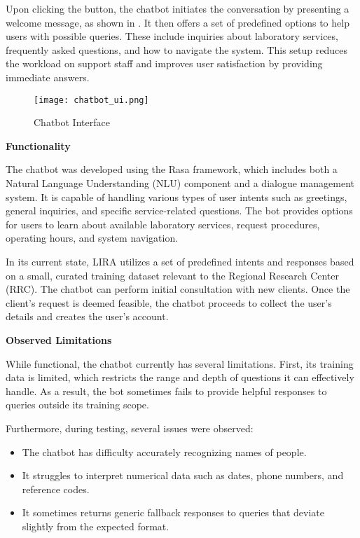 Upon clicking the button, the chatbot initiates the conversation by presenting a welcome message, as shown in . It then offers a set of predefined options to help users with possible queries. These include inquiries about laboratory services, frequently asked questions, and how to navigate the system. This setup reduces the workload on support staff and improves user satisfaction by providing immediate answers.

\begin{figure}[h]
	\centering
	\texttt{[image: chatbot\_ui.png]}
	\caption{Chatbot Interface}
	\label{fig:chatbot_ui}
\end{figure}

\textbf{Functionality}

The chatbot was developed using the Rasa framework, which includes both a Natural Language Understanding (NLU) component and a dialogue management system. It is capable of handling various types of user intents such as greetings, general inquiries, and specific service-related questions. The bot provides options for users to learn about available laboratory services, request procedures, operating hours, and system navigation.

In its current state, LIRA utilizes a set of predefined intents and responses based on a small, curated training dataset relevant to the Regional Research Center (RRC). The chatbot can perform initial consultation with new clients. Once the client's request is deemed feasible, the chatbot proceeds to collect the user’s details and creates the user's account. 

\textbf{Observed Limitations}

While functional, the chatbot currently has several limitations. First, its training data is limited, which restricts the range and depth of questions it can effectively handle. As a result, the bot sometimes fails to provide helpful responses to queries outside its training scope.

Furthermore, during testing, several issues were observed:
\begin{itemize}
    \item The chatbot has difficulty accurately recognizing names of people.
    \item It struggles to interpret numerical data such as dates, phone numbers, and reference codes.
    \item It sometimes returns generic fallback responses to queries that deviate slightly from the expected format.
\end{itemize}

